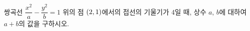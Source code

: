 쌍곡선 $\dfrac{x^2}{a}-\dfrac{y^2}{b}=1$ 위의 점 $(2{,}\mkern3mu\mathopen{}1)$에서의 접선의 기울기가 $4$일 때, 상수 $a$, $b$에 대하여 $a+b$의 값을 구하시오.
